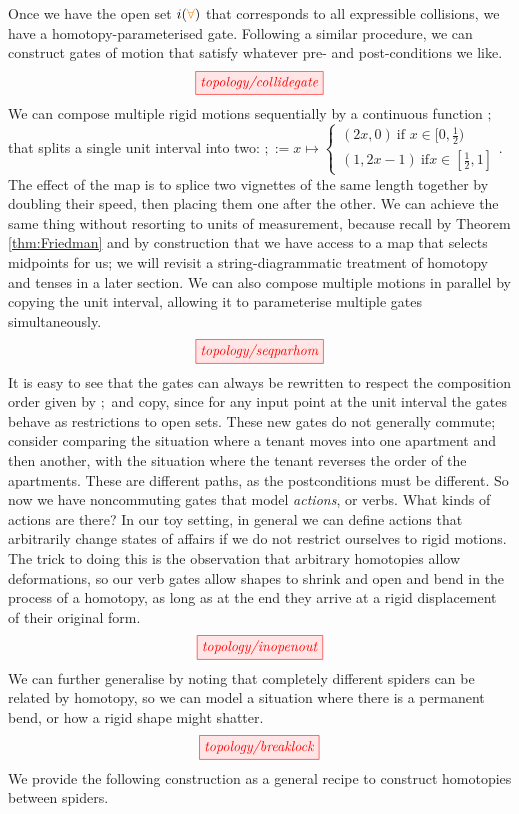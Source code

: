\begin{fullwidth}
Once we have the open set $i(\textcolor{orange}{\forall})$ that corresponds to all expressible collisions, we have a homotopy-parameterised gate. Following a similar procedure, we can construct gates of motion that satisfy whatever pre- and post-conditions we like.
\[\tikzfig{topology/collidegate}\]
We can compose multiple rigid motions sequentially by a continuous function $\mathbf{;}$ that splits a single unit interval into two: $\mathbf{;} := x \mapsto \begin{cases} (2x,0) \ \text{if } x \in [0,\frac{1}{2}) \\ (1,2x - 1) \ \text{if} x \in [\frac{1}{2},1] \end{cases}$. The effect of the map is to splice two vignettes of the same length together by doubling their speed, then placing them one after the other. We can achieve the same thing without resorting to units of measurement, because recall by Theorem \ref{thm:Friedman} and by construction that we have access to a map that selects midpoints for us; we will revisit a string-diagrammatic treatment of homotopy and tenses in a later section. We can also compose multiple motions in parallel by copying the unit interval, allowing it to parameterise multiple gates simultaneously.
\[\tikzfig{topology/seqparhom}\]
It is easy to see that the gates can always be rewritten to respect the composition order given by $\mathbf{;}$ and copy, since for any input point at the unit interval the gates behave as restrictions to open sets. These new gates do not generally commute; consider comparing the situation where a tenant moves into one apartment and then another, with the situation where the tenant reverses the order of the apartments. These are different paths, as the postconditions must be different. So now we have noncommuting gates that model \emph{actions}, or verbs. What kinds of actions are there? In our toy setting, in general we can define actions that arbitrarily change states of affairs if we do not restrict ourselves to rigid motions. The trick to doing this is the observation that arbitrary homotopies allow deformations, so our verb gates allow shapes to shrink and open and bend in the process of a homotopy, as long as at the end they arrive at a rigid displacement of their original form.
\[\tikzfig{topology/inopenout}\]
We can further generalise by noting that completely different spiders can be related by homotopy, so we can model a situation where there is a permanent bend, or how a rigid shape might shatter.
\[\tikzfig{topology/breaklock}\]
We provide the following construction as a general recipe to construct homotopies between spiders.

\end{fullwidth}
